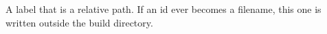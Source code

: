 \begin{lemma}\label{../../escape}
A label that is a relative path. If an id ever becomes a filename, this one is written outside the build directory.
\end{lemma}